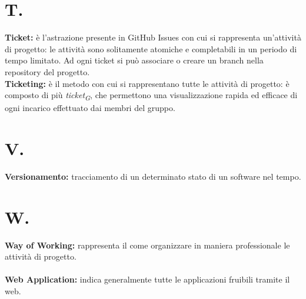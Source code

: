 \documentclass[a4paper, 12pt]{article}
\begin{document}
\newpage
\section{T.}
\textbf{Ticket:} è l'astrazione presente in GitHub Issues con cui si rappresenta
un'attività di progetto: le attività sono solitamente atomiche e completabili in
un periodo di tempo limitato. Ad ogni ticket si può associare o creare un branch
nella repository del progetto.\\
\textbf{Ticketing:} è il metodo con cui si rappresentano tutte le attività di
progetto: è composto di più \textit{ticket\textsubscript{G}}, che permettono una visualizzazione rapida ed
efficace di ogni incarico effettuato dai membri del gruppo. \\
\newpage
\section{V.}
\textbf{Versionamento:} tracciamento di un determinato stato di un software nel tempo. \\

\newpage
\section{W.}
\textbf{Way of Working:} rappresenta il come organizzare in maniera professionale le attività di progetto.\\ \\
\textbf{Web Application:} indica generalmente tutte le applicazioni fruibili
tramite il web.
\end{document}
